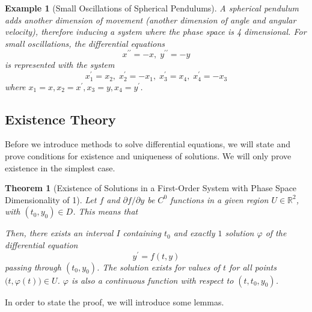 \documentclass{article}
\newtheorem{theorem}{Theorem}[section]
\newtheorem{example}{Example}[section]
\theoremstyle{remark}
\theoremstyle{definition}
\begin{document}
      \begin{example}[Small Oscillations of Spherical Pendulums]
      A spherical pendulum adds another dimension of movement (another dimension of angle and angular velocity), therefore inducing a system where the phase space is 4 dimensional. For small oscillations, the differential equations
      \[x^{\prime\prime} = -x, \; y^{\prime\prime} = - y\]
      is represented with the system
      \[x_1^\prime = x_2, \; x_2^\prime = -x_1, \; x_3^\prime = x_4, \; x_4^\prime = - x_3\]
      where $x_1 = x, x_2 = x^\prime, x_3 = y, x_4 = y^\prime$. 
      \end{example}

  \subsection{Existence Theory}

    Before we introduce methods to solve differential equations, we will state and prove conditions for existence and uniqueness of solutions. We will only prove existence in the simplest case. 
    \begin{theorem}[Existence of Solutions in a First-Order System with Phase Space Dimensionality of 1]
    Let $f$ and $\partial f / \partial y$ be $C^0$ functions in a given region $U \in \mathbb{R}^2$, with $(t_0, y_0) \in D$. This means that 

    Then, there exists an interval $I$ containing $t_0$ and exactly $1$ solution $\varphi$ of the differential equation 
    \[y^\prime = f(t, y)\]
    passing through $(t_0, y_0)$. The solution exists for values of $t$ for all points $\big(t, \varphi(t)\big) \in U$. $\varphi$ is also a continuous function with respect to $(t, t_0, y_0)$. 
    \end{theorem}
    In order to state the proof, we will introduce some lemmas. 
\end{document}
